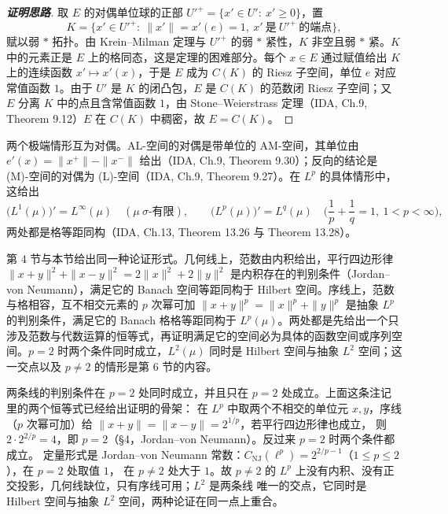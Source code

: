 \documentclass[oneside]{book}
\theoremstyle{definition}
\theoremstyle{definition}
\begin{document}
	\begin{proof}[\bfseries{证明思路}]
		取 $E$ 的对偶单位球的正部 $U'^{+}=\{x'\in U':\ x'\geqslant0\}$，置
		\[
		K=\big\{x'\in U'^{+}:\ \|x'\|=x'(e)=1,\ x'\ \text{是}\ U'^{+}\ \text{的端点}\big\},
		\]
		赋以弱 $*$ 拓扑。由 Krein--Milman 定理与 $U'^{+}$ 的弱 $*$ 紧性，$K$ 非空且弱 $*$ 紧。$K$ 中的元素正是 $E$ 上的格同态，这是定理的困难部分。每个 $x\in E$ 通过赋值给出 $K$ 上的连续函数 $x'\mapsto x'(x)$，于是 $E$ 成为 $C(K)$ 的 Riesz 子空间，单位 $e$ 对应常值函数 $1$。由于 $U'$ 是 $K$ 的闭凸包，$E$ 是 $C(K)$ 的范数闭 Riesz 子空间；又 $E$ 分离 $K$ 中的点且含常值函数 $1$，由 Stone--Weierstrass 定理（IDA, Ch.9, Theorem 9.12）$E$ 在 $C(K)$ 中稠密，故 $E=C(K)$。
	\end{proof}
	
	两个极端情形互为对偶。AL-空间的对偶是带单位的 AM-空间，其单位由 $e'(x)=\|x^{+}\|-\|x^{-}\|$ 给出（IDA, Ch.9, Theorem 9.30）；反向的结论是 (M)-空间的对偶为 (L)-空间（IDA, Ch.9, Theorem 9.27）。在 $L^{p}$ 的具体情形中，这给出
	\[
	\big(L^{1}(\mu)\big)'=L^{\infty}(\mu)\quad(\mu\ \sigma\text{-}\text{有限}),\qquad
	\big(L^{p}(\mu)\big)'=L^{q}(\mu)\quad\Big(\frac1p+\frac1q=1,\ 1<p<\infty\Big),
	\]
	两处都是格等距同构（IDA, Ch.13, Theorem 13.26 与 Theorem 13.28）。
	
	\begin{note}
		第 4 节与本节给出同一种论证形式。几何线上，范数由内积给出，平行四边形律
		$\|x+y\|^{2}+\|x-y\|^{2}=2\|x\|^{2}+2\|y\|^{2}$ 是内积存在的判别条件（Jordan--von Neumann），满足它的 Banach 空间等距同构于 Hilbert 空间。序线上，范数与格相容，互不相交元素的 $p$ 次幂可加
		$\|x+y\|^{p}=\|x\|^{p}+\|y\|^{p}$ 是抽象 $L^{p}$ 的判别条件，满足它的 Banach 格格等距同构于 $L^{p}(\mu)$。两处都是先给出一个只涉及范数与代数运算的恒等式，再证明满足它的空间必为具体的函数空间或序列空间。$p=2$ 时两个条件同时成立，$L^{2}(\mu)$ 同时是 Hilbert 空间与抽象 $L^{2}$ 空间；这一交点以及 $p\neq2$ 的情形是第 6 节的内容。
	\end{note}
	
	\begin{link}[两条线的唯一交点：$L^{2}$]
		两条线的判别条件在 $p=2$ 处同时成立，并且只在 $p=2$ 处成立。上面这条注记里的两个恒等式已经给出证明的骨架：
		在 $L^{p}$ 中取两个不相交的单位元 $x,y$，序线（$p$ 次幂可加）给 $\|x+y\|=\|x-y\|=2^{1/p}$，若平行四边形律也成立，
		则 $2\cdot2^{2/p}=4$，即 $p=2$（\S 4，Jordan--von Neumann）。反过来 $p=2$ 时两个条件都成立。
		定量形式是 Jordan--von Neumann 常数：$C_{\mathrm{NJ}}(\ell^{p})=2^{2/p-1}$（$1\leqslant p\leqslant2$），在 $p=2$ 处取值 $1$，
		在 $p\ne2$ 处大于 $1$。故 $p\ne2$ 的 $L^{p}$ 上没有内积、没有正交投影，几何线缺位，只有序线可用；$L^{2}$ 是两条线
		唯一的交点，它同时是 Hilbert 空间与抽象 $L^{2}$ 空间，两种论证在同一点上重合。
	\end{link}
	
\end{document}
